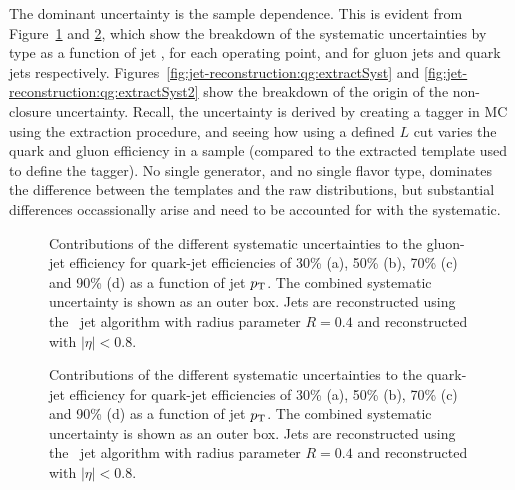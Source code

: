 The dominant uncertainty is the sample dependence. This is evident from Figure~\ref{fig:jet-reconstruction:qg:systSplit} and \ref{fig:jet-reconstruction:qg:systSplitQ}, which show the breakdown of the systematic uncertainties by type as a function of jet \pt, for each operating point, and for gluon jets and quark jets respectively. Figures~\ref{fig:jet-reconstruction:qg:extractSyst} and \ref{fig:jet-reconstruction:qg:extractSyst2} show the breakdown of the origin of the non-closure uncertainty. Recall, the uncertainty is derived by creating a tagger in MC using the extraction procedure, and seeing how using a defined $L$ cut varies the quark and gluon efficiency in a sample (compared to the extracted template used to define the tagger). No single generator, and no single flavor type, dominates the difference between the templates and the raw distributions, but substantial differences occassionally arise and need to be accounted for with the systematic.


\begin{figure}[htbp]
\begin{center}
\caption{
Contributions of the different systematic uncertainties to the gluon-jet efficiency 
for quark-jet efficiencies of 30\% (a), 50\% (b), 70\% (c) and 90\% (d) 
as a function of jet $p_{\text{T}}$. The combined systematic uncertainty is 
shown as an outer box.  
Jets are reconstructed using the \AKT\ jet algorithm with radius parameter 
$R=0.4$ and reconstructed with $|\eta|<0.8$. }
\label{fig:jet-reconstruction:qg:systSplit}
\end{center}
\end{figure}

\begin{figure}[htbp]
\begin{center}
\caption{
Contributions of the different systematic uncertainties to the quark-jet efficiency 
for quark-jet efficiencies of 30\% (a), 50\% (b), 70\% (c) and 90\% (d) 
as a function of jet $p_{\text{T}}$. The combined systematic uncertainty is 
shown as an outer box.  
Jets are reconstructed using the \AKT\ jet algorithm with radius parameter 
$R=0.4$ and reconstructed with $|\eta|<0.8$. }
\label{fig:jet-reconstruction:qg:systSplitQ}
\end{center}
\end{figure}

